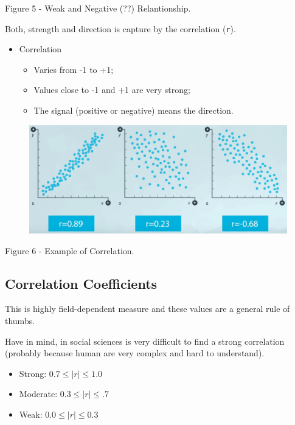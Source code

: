 \documentclass[]{book}
\providecommand{\tightlist}{%
  \setlength{\itemsep}{0pt}\setlength{\parskip}{0pt}}
\begin{document}
Figure 5 - Weak and Negative (??) Relantionship.

Both, strength and direction is capture by the correlation (\texttt{r}).

\begin{itemize}
\tightlist
\item
  Correlation

  \begin{itemize}
  \tightlist
  \item
    Varies from -1 to +1;
  \item
    Values close to -1 and +1 are very strong;
  \item
    The signal (positive or negative) means the direction.
  \end{itemize}
\end{itemize}

\begin{figure}
\centering
\includegraphics{01-img/c4_l14_06.png}
\caption{}
\end{figure}

Figure 6 - Example of Correlation.

\subsection{Correlation Coefficients}\label{correlation-coefficients}

This is highly field-dependent measure and these values are a general
rule of thumbs.

Have in mind, in social sciences is very difficult to find a strong
correlation (probably because human are very complex and hard to
understand).

\begin{itemize}
\tightlist
\item
  Strong: \(0.7 \leq |r| \leq 1.0\)
\item
  Moderate: \(0.3 \leq |r| \leq .7\)
\item
  Weak: \(0.0 \leq |r| \leq 0.3\)
\end{itemize}
\end{document}

